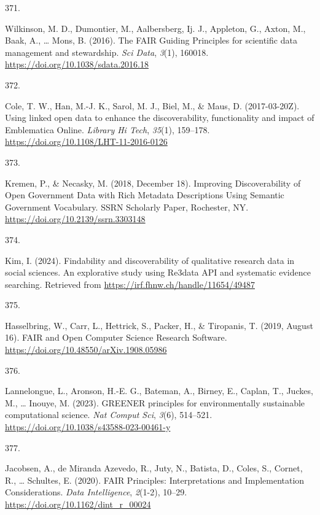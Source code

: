 \documentclass[
  11pt,
  letterpaper,
]{scrreprt}
\newlength{\cslhangindent}
\newlength{\csllabelwidth}
\newenvironment{CSLReferences}[2] %
 {\begin{list}{}{%
  \setlength{\itemindent}{0pt}
  \setlength{\leftmargin}{0pt}
  \setlength{\parsep}{0pt}
  \ifodd #1
   \setlength{\leftmargin}{\cslhangindent}
   \setlength{\itemindent}{-1\cslhangindent}
  \fi
  \setlength{\itemsep}{#2\baselineskip}}}
 {\end{list}}
\newcommand{\CSLLeftMargin}[1]{\parbox[t]{\csllabelwidth}{\strut#1\strut}}
\newcommand{\CSLRightInline}[1]{\parbox[t]{\linewidth - \csllabelwidth}{\strut#1\strut}}
\begin{document}
\begin{CSLReferences}{0}{0}
\CSLLeftMargin{371. }%
\CSLRightInline{Wilkinson, M. D., Dumontier, M., Aalbersberg, Ij. J.,
Appleton, G., Axton, M., Baak, A., \ldots{} Mons, B. (2016). The {FAIR
Guiding Principles} for scientific data management and stewardship.
\emph{Sci Data}, \emph{3}(1), 160018.
\url{https://doi.org/10.1038/sdata.2016.18}}

\CSLLeftMargin{372. }%
\CSLRightInline{Cole, T. W., Han, M.-J. K., Sarol, M. J., Biel, M., \&
Maus, D. (2017-03-20Z). Using linked open data to enhance the
discoverability, functionality and impact of {Emblematica Online}.
\emph{Library Hi Tech}, \emph{35}(1), 159--178.
\url{https://doi.org/10.1108/LHT-11-2016-0126}}

\CSLLeftMargin{373. }%
\CSLRightInline{Kremen, P., \& Necasky, M. (2018, December 18).
Improving {Discoverability} of {Open Government Data} with {Rich
Metadata Descriptions Using Semantic Government Vocabulary}. SSRN
Scholarly Paper, Rochester, NY.
\url{https://doi.org/10.2139/ssrn.3303148}}

\CSLLeftMargin{374. }%
\CSLRightInline{Kim, I. (2024). Findability and discoverability of
qualitative research data in social sciences. {An} explorative study
using Re3data {API} and systematic evidence searching. Retrieved from
\url{https://irf.fhnw.ch/handle/11654/49487}}

\CSLLeftMargin{375. }%
\CSLRightInline{Hasselbring, W., Carr, L., Hettrick, S., Packer, H., \&
Tiropanis, T. (2019, August 16). {FAIR} and {Open Computer Science
Research Software}. \url{https://doi.org/10.48550/arXiv.1908.05986}}

\CSLLeftMargin{376. }%
\CSLRightInline{Lannelongue, L., Aronson, H.-E. G., Bateman, A., Birney,
E., Caplan, T., Juckes, M., \ldots{} Inouye, M. (2023). {GREENER}
principles for environmentally sustainable computational science.
\emph{Nat Comput Sci}, \emph{3}(6), 514--521.
\url{https://doi.org/10.1038/s43588-023-00461-y}}

\CSLLeftMargin{377. }%
\CSLRightInline{Jacobsen, A., de Miranda Azevedo, R., Juty, N., Batista,
D., Coles, S., Cornet, R., \ldots{} Schultes, E. (2020). {FAIR
Principles}: {Interpretations} and {Implementation Considerations}.
\emph{Data Intelligence}, \emph{2}(1-2), 10--29.
\url{https://doi.org/10.1162/dint_r_00024}}


\end{CSLReferences}
\end{document}
